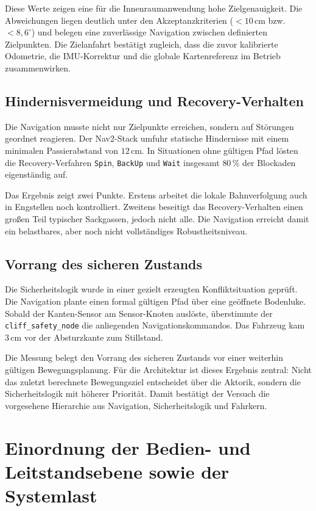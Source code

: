 Diese Werte zeigen eine für die Innenraumanwendung hohe Zielgenauigkeit. Die Abweichungen liegen deutlich unter den Akzeptanzkriterien ($< 10\,\mathrm{cm}$ bzw.\ $< 8{,}6^\circ$) und belegen eine zuverlässige Navigation zwischen definierten Zielpunkten. Die Zielanfahrt bestätigt zugleich, dass die zuvor kalibrierte Odometrie, die IMU-Korrektur und die globale Kartenreferenz im Betrieb zusammenwirken.

\subsection{Hindernisvermeidung und Recovery-Verhalten}

Die Navigation musste nicht nur Zielpunkte erreichen, sondern auf Störungen geordnet reagieren. Der Nav2-Stack umfuhr statische Hindernisse mit einem minimalen Passierabstand von $12\,\mathrm{cm}$. In Situationen ohne gültigen Pfad lösten die Recovery-Verfahren \texttt{Spin}, \texttt{BackUp} und \texttt{Wait} insgesamt $80\,\%$ der Blockaden eigenständig auf.

Das Ergebnis zeigt zwei Punkte. Erstens arbeitet die lokale Bahnverfolgung auch in Engstellen noch kontrolliert. Zweitens beseitigt das Recovery-Verhalten einen großen Teil typischer Sackgassen, jedoch nicht alle. Die Navigation erreicht damit ein belastbares, aber noch nicht vollständiges Robustheitsniveau.

\subsection{Vorrang des sicheren Zustands}

Die Sicherheitslogik wurde in einer gezielt erzeugten Konfliktsituation geprüft. Die Navigation plante einen formal gültigen Pfad über eine geöffnete Bodenluke. Sobald der Kanten-Sensor am Sensor-Knoten auslöste, überstimmte der \texttt{cliff\_safety\_node} die anliegenden Navigationskommandos. Das Fahrzeug kam $3\,\mathrm{cm}$ vor der Absturzkante zum Stillstand.

Die Messung belegt den Vorrang des sicheren Zustands vor einer weiterhin gültigen Bewegungsplanung. Für die Architektur ist dieses Ergebnis zentral: Nicht das zuletzt berechnete Bewegungsziel entscheidet über die Aktorik, sondern die Sicherheitslogik mit höherer Priorität. Damit bestätigt der Versuch die vorgesehene Hierarchie aus Navigation, Sicherheitslogik und Fahrkern.

\section{Einordnung der Bedien- und Leitstandsebene sowie der Systemlast}

